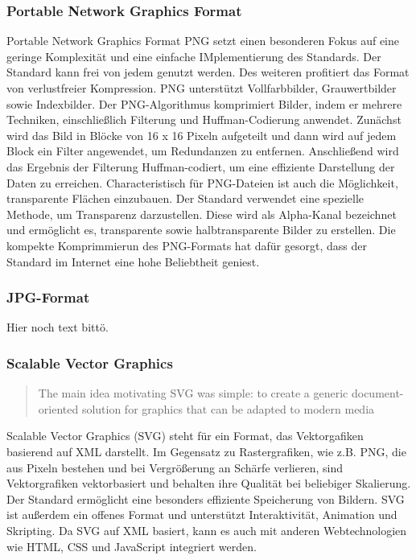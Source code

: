 \subsubsection{Portable Network Graphics Format}
Portable Network Graphics Format \ac{PNG} setzt einen besonderen Fokus auf eine geringe Komplexität und eine einfache IMplementierung des Standards. 
Der Standard kann frei von jedem genutzt werden.
Des weiteren profitiert das Format von verlustfreier Kompression. 
PNG unterstützt Vollfarbbilder, Grauwertbilder sowie Indexbilder. 
Der PNG-Algorithmus komprimiert Bilder, indem er mehrere Techniken, einschließlich Filterung und Huffman-Codierung anwendet. Zunächst wird das Bild in Blöcke von 16 x 16 Pixeln aufgeteilt und dann wird auf jedem Block ein Filter angewendet, um Redundanzen zu entfernen. Anschließend wird das Ergebnis der Filterung Huffman-codiert, um eine effiziente Darstellung der Daten zu erreichen.
Characteristisch für PNG-Dateien ist auch die Möglichkeit, transparente Flächen einzubauen. 
Der Standard verwendet eine spezielle Methode, um Transparenz darzustellen. 
Diese wird als Alpha-Kanal bezeichnet und ermöglicht es, transparente sowie halbtransparente Bilder zu erstellen.
Die kompekte Komprimmierun des PNG-Formats hat dafür gesorgt, dass der Standard im Internet eine hohe Beliebtheit geniest. 

\subsubsection{JPG-Format}

Hier noch text bittö.


\subsubsection{Scalable Vector Graphics}
\begin{quote}
    The main idea motivating \ac{SVG} was simple: to create a generic document-oriented solution  for graphics that can be adapted to modern media
    \grqq{}~
\end{quote}
Scalable Vector Graphics (SVG) steht für ein Format, das Vektorgafiken basierend auf \ac{XML} darstellt.
Im Gegensatz zu Rastergrafiken, wie z.B. PNG, die aus Pixeln bestehen und bei Vergrößerung an Schärfe verlieren, sind Vektorgrafiken vektorbasiert und behalten ihre Qualität bei beliebiger Skalierung. 
Der Standard ermöglicht eine besonders effiziente Speicherung von Bildern.
SVG ist außerdem ein offenes Format und unterstützt Interaktivität, Animation und Skripting. 
Da SVG auf XML basiert, kann es auch mit anderen Webtechnologien wie HTML, \ac{CSS} und JavaScript integriert werden. 

